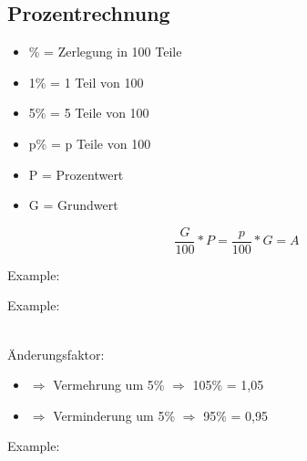 \newpage
\subsection{Prozentrechnung}

\begin{itemize}
    \item \% = Zerlegung in 100 Teile
    \item 1\% = 1 Teil von 100
    \item 5\% = 5 Teile von 100
    \item p\% = p Teile von 100
    \item P = Prozentwert
    \item G = Grundwert
\end{itemize}

\hfill \break
$$\frac{G}{100}*P = \frac{p}{100}*G = A$$


\hfill \break
Example:\\
{\setlength{\fboxrule}{0.8pt}
}

\hfill \break
Example:\\
\fboxrule=0.8pt \\
\medskip

\hfill \break
Änderungsfaktor:
\begin{itemize}
    \item $\Rightarrow$ Vermehrung um 5\% $\Rightarrow$ 105\% = 1,05
    \item $\Rightarrow$ Verminderung um 5\% $\Rightarrow$ 95\% = 0,95
\end{itemize}
\medskip
Example:\\
\fboxrule=0.8pt 
